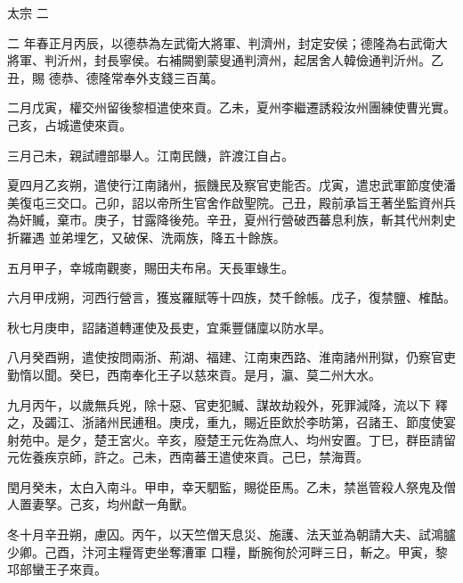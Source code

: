 
\begin{pinyinscope}

 太宗
 二



 二
 年春正月丙辰，以德恭為左武衛大將軍、判濟州，封定安侯；德隆為右武衛大將軍、判沂州，封長寧侯。右補闕劉蒙叟通判濟州，起居舍人韓儉通判沂州。乙丑，賜
 德恭、德隆常奉外支錢三百萬。



 二月戊寅，權交州留後黎桓遣使來貢。乙未，夏州李繼遷誘殺汝州團練使曹光實。己亥，占城遣使來貢。



 三月己未，親試禮部舉人。江南民饑，許渡江自占。



 夏四月乙亥朔，遣使行江南諸州，振饑民及察官吏能否。戊寅，遣忠武軍節度使潘美復屯三交口。己卯，詔以帝所生官舍作啟聖院。己丑，殿前承旨王著坐監資州兵為奸贓，棄市。庚子，甘露降後苑。辛丑，夏州行營破西蕃息利族，斬其代州刺史折羅遇
 並弟埋乞，又破保、洗兩族，降五十餘族。



 五月甲子，幸城南觀麥，賜田夫布帛。天長軍蝝生。



 六月甲戌朔，河西行營言，獲岌羅賦等十四族，焚千餘帳。戊子，復禁鹽、榷酤。



 秋七月庚申，詔諸道轉運使及長吏，宜乘豐儲廩以防水旱。



 八月癸酉朔，遣使按問兩浙、荊湖、福建、江南東西路、淮南諸州刑獄，仍察官吏勤惰以聞。癸巳，西南奉化王子以慈來貢。是月，瀛、莫二州大水。



 九月丙午，以歲無兵兇，除十惡、官吏犯贓、謀故劫殺外，死罪減降，流以下
 釋之，及蠲江、浙諸州民逋租。庚戌，重九，賜近臣飲於李昉第，召諸王、節度使宴射苑中。是夕，楚王宮火。辛亥，廢楚王元佐為庶人、均州安置。丁巳，群臣請留元佐養疾京師，許之。己未，西南蕃王遣使來貢。己巳，禁海賈。



 閏月癸未，太白入南斗。甲申，幸天駟監，賜從臣馬。乙未，禁邕管殺人祭鬼及僧人置妻孥。己亥，均州獻一角獸。



 冬十月辛丑朔，慮囚。丙午，以天竺僧天息災、施護、法天並為朝請大夫、試鴻臚少卿。己酉，汴河主糧胥吏坐奪漕軍
 口糧，斷腕徇於河畔三日，斬之。甲寅，黎邛部蠻王子來貢。




\end{pinyinscope}

